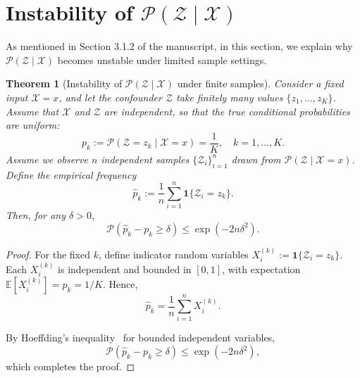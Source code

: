 \documentclass[10pt,twocolumn,letterpaper]{article}
\theoremstyle{plain}
\newtheorem{theorem}{Theorem}
\theoremstyle{definition}
\theoremstyle{remark}
\begin{document}




\section{Instability of \texorpdfstring{$\mathcal{P}(\mathcal{Z}\mid \mathcal{X})$}{P(Z|X)}}
As mentioned in Section 3.1.2 of the manuscript, in this section, we explain why $\mathcal{P}(\mathcal{Z}\mid\mathcal{X})$ becomes unstable under limited sample settings.
\begin{theorem}[Instability of $\mathcal{P}(\mathcal{Z}\mid \mathcal{X})$ under finite samples]
Consider a fixed input $\mathcal{X} = x$, and let the confounder $\mathcal{Z}$ take finitely many values 
$\{z_1, \dots, z_K\}$. 
Assume that $\mathcal{X}$ and $\mathcal{Z}$ are independent, so that the true conditional probabilities are uniform:
\[
p_k := \mathcal{P}(\mathcal{Z} = z_k \mid \mathcal{X} = x) = \frac{1}{K}, \quad k = 1, \dots, K.
\]
Assume we observe $n$ independent samples $\{\mathcal{Z}_i\}_{i=1}^n$ drawn from 
$\mathcal{P}(\mathcal{Z} \mid \mathcal{X} = x)$. 
Define the empirical frequency
\[
\hat p_k := \frac{1}{n}\sum_{i=1}^n \mathbf{1}\{\mathcal{Z}_i = z_k\}.
\]
Then, for any $\delta > 0$,
\[
\mathcal{P}\!\left(\hat p_k - p_k \ge \delta\right) \le \exp\!\left(-2n\delta^2\right).
\]
\end{theorem}

\begin{proof}\renewcommand{\qedsymbol}{}
For the fixed $k$, define indicator random variables 
$X_i^{(k)} := \mathbf{1}\{\mathcal{Z}_i = z_k\}$. 
Each $X_i^{(k)}$ is independent and bounded in $[0,1]$, 
with expectation $\mathbb{E}[X_i^{(k)}] = p_k = 1/K$. 
Hence,
\[
\hat p_k = \frac{1}{n}\sum_{i=1}^n X_i^{(k)}.
\]

By Hoeffding's inequality~\cite{hoeffding1963probability} for bounded independent variables,
\[
\mathcal{P}\!\left(\hat p_k - p_k \ge \delta\right)
\le \exp\!\left(-2n\delta^2\right),
\]
which completes the proof.
\end{proof}
\end{document}
